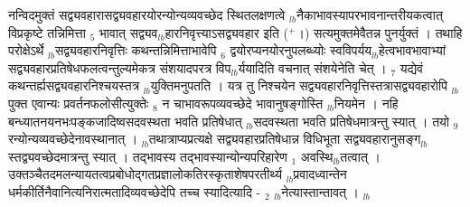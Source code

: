 \documentclass[article,12pt,a4paper]{memoir}%
\newcommand{\add}[1]{($^{+}$#1)}
\newcounter{parCount}
\begin{document}
	  
	  \pstart \leavevmode%
	\hphantom{.}नन्विदमुक्तं {\color{DodgerBlue3}सद्व्यवहारासद्व्यवहारयोरन्योन्यव्यवच्छेद} स्थितलक्षणत्वे {\tiny $_{lb}$}नैकाभावस्यापरभावनान्तरीयकत्वात् विप्रकृष्टे तन्निमित्ता {\tiny $_{5}$} भावात् सद्व्यव{\tiny $_{lb}$}हारनिवृत्त्याऽसद्व्यवहार इति \add{।} सत्यमुक्तमेवैतन्न पुनर्युक्तं । तथाहि परोक्षेऽर्थे {\tiny $_{lb}$}सद्व्यवहारनिवृत्तिः कथन्तन्निमित्ताभावेपि {\tiny $_{6}$} द्वयोरप्यनयोरनुपलब्ध्योः स्वविपर्यय{\tiny $_{lb}$}हेत्वभावभावाभ्यां सद्व्यवहारप्रतिषेधफलत्वन्तुल्यमेकत्र संशयादपरत्र विप{\tiny $_{lb}$}र्ययादिति वचनात् संशयेनेति चेत् । {\tiny $_{7}$} यद्येवं कथन्तर्ह्यसद्व्यवहारनिश्चयस्तत्र {\tiny $_{lb}$}युक्तिमनुपतति । यत्र तु निश्चयेन सद्व्यवहारनिवृत्तिस्तत्रासद्व्यवहारोपि {\tiny $_{lb}$}पुक्त एवान्यः प्रवर्तनफलोसीत्युक्तेः {\tiny $_{8}$} न चाभावरूपव्यवच्छेदे भावानुषङ्गोस्ति {\tiny $_{lb}$}नियमेन । नहि बन्ध्यातनयनभःपङ्कजादिष्वसदवस्थता भवति प्रतिषेधात् {\tiny $_{lb}$}सदवस्थता भवति प्रतिषेधमात्रन्तु स्यात् । तयो {\tiny $_{9}$}\leavevmode{} रन्योन्यव्यवच्छेदेनावस्थानात् । {\tiny $_{lb}$}तथात्राप्यप्रत्यक्षे सद्व्यवहारप्रतिषेधान्न विधिभूता सद्व्यवहारानुसङ्ग{\tiny $_{lb}$}स्तद्व्यवच्छेदमात्रन्तु स्यात् । तद्भावस्य तद्भावस्यान्योन्यपरिहारेण {\tiny $_{1}$} अवस्थि{\tiny $_{lb}$}तत्वात् । उक्तञ्चैतदमलन्यायतत्वप्रबोधोद्गतप्रज्ञालोकतिरस्कृताशेषपरतीर्थ्य {\tiny $_{lb}$}प्रवादध्वान्तेन {\color{DodgerBlue3}धर्मकीर्तिनैवानित्यनिरात्मतादिव्यवच्छेदेपि तच्च स्यादित्यादि} - {\tiny $_{2}$} {\tiny $_{lb}$}नेत्यास्तान्तावत् ।
	{}
	\pend%
      {\tiny $_{lb}$}
\end{document}
